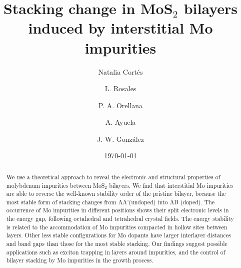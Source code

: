 \documentclass[pra,twocolumn,preprintnumbers,amsmath,amssymb]{revtex4}
\begin{document}
\title{Stacking change in MoS$_{2}$ bilayers induced by interstitial Mo impurities}

\author{Natalia Cort\'es}

\author{L. Rosales}

\author{P. A. Orellana}


\author{A. Ayuela}


\author{J. W. Gonz\'alez}

\date{\today}

\begin{abstract}
We use a theoretical approach to reveal the electronic and structural properties of molybdenum impurities between MoS$_{2}$ bilayers.
We find that interstitial Mo impurities are able to reverse the well-known stability order of the pristine bilayer, because the most stable form of stacking changes from AA'(undoped) into AB (doped).
The occurrence of Mo impurities in different positions shows their split electronic levels in the energy gap, following octahedral and tetrahedral crystal fields.
The energy stability is related to the accommodation of Mo impurities compacted in hollow sites between layers.
Other less stable configurations for Mo dopants have larger interlayer distances and band gaps than those for the most stable stacking.
Our findings suggest possible applications such as exciton trapping in layers around impurities, and the control of bilayer stacking by Mo impurities in the growth process.

\end{abstract}
\end{document}
